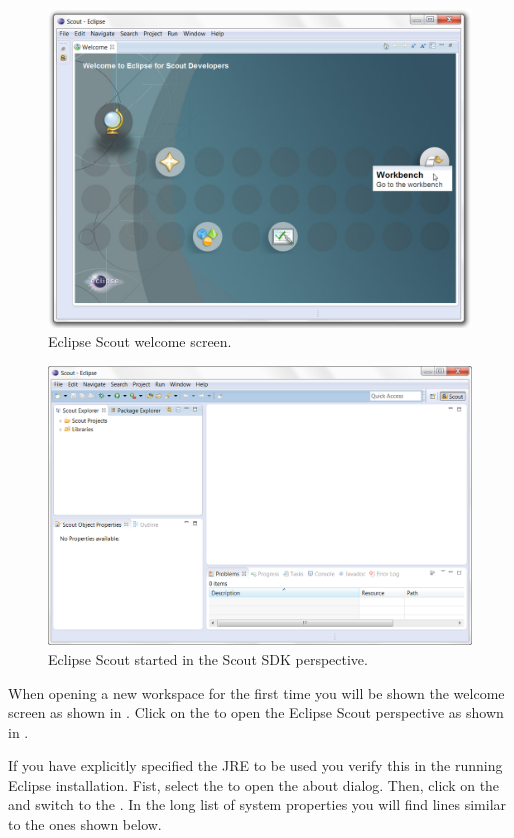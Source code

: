 \documentclass[a4paper,10pt,twoside]{book}
\begin{document}
\begin{figure}
\includegraphics[width=13cm]{scout_startup_welcome.png}
\caption{Eclipse Scout welcome screen.}
\end{figure}

\begin{figure}
\includegraphics[width=13cm]{scout_startup_scout_explorer.png}
\caption{Eclipse Scout started in the Scout SDK perspective. }
\end{figure}

When opening a new workspace for the first time you will be shown the welcome screen as shown in .
Click on the  to open the Eclipse Scout perspective as shown in .

If you have explicitly specified the JRE to be used you verify this in the running Eclipse installation.
Fist, select the  to open the about dialog.
Then, click on the  and switch to the .
In the long list of system properties you will find lines similar to the ones shown below.
\end{document}
